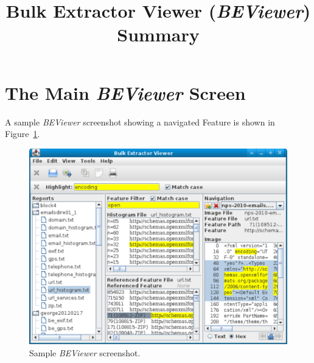 \documentclass[10pt,twoside]{article}
\newcommand{\bulk}{\emph{bulk\_extractor}\xspace}
\newcommand{\bev}{\emph{BEViewer}\xspace}
\begin{document}

\title{Bulk Extractor Viewer (\bev) Summary}
\maketitle



\section{The Main \bev Screen}
A sample \bev screenshot showing a navigated Feature is shown in Figure~\ref{bev-example}.
\begin{figure}[h]
\center
\includegraphics[scale=0.4]{images/BEViewer_example}
\caption{Sample \bev screenshot.\label{bev-example}}
\end{figure}
\end{document}
